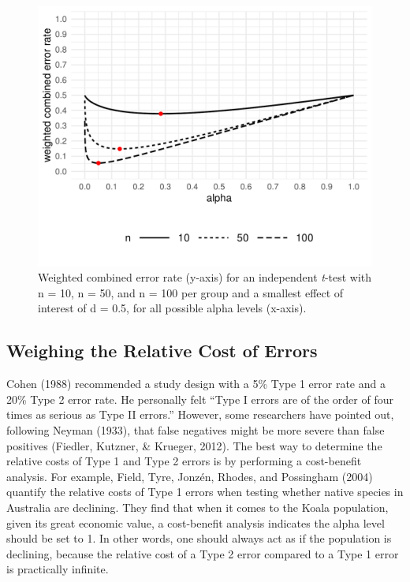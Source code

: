 \documentclass[
  english,
  ,man, a4paper,floatsintext]{apa6}
\begin{document}
\begin{figure}
\centering
\includegraphics{Justify_in_Practice_files/figure-latex/weight-plot-1.pdf}
\caption{\label{fig:weight-plot}Weighted combined error rate (y-axis) for an independent \emph{t}-test with n = 10, n = 50, and n = 100 per group and a smallest effect of interest of d = 0.5, for all possible alpha levels (x-axis).}
\end{figure}

\hypertarget{weighing-the-relative-cost-of-errors}{%
\subsection{Weighing the Relative Cost of Errors}\label{weighing-the-relative-cost-of-errors}}

Cohen (1988) recommended a study design with a 5\% Type 1 error rate and a 20\% Type 2 error rate. He personally felt ``Type I errors are of the order of four times as serious as Type II errors.'' However, some researchers have pointed out, following Neyman (1933), that false negatives might be more severe than false positives (Fiedler, Kutzner, \& Krueger, 2012). The best way to determine the relative costs of Type 1 and Type 2 errors is by performing a cost-benefit analysis. For example, Field, Tyre, Jonzén, Rhodes, and Possingham (2004) quantify the relative costs of Type 1 errors when testing whether native species in Australia are declining. They find that when it comes to the Koala population, given its great economic value, a cost-benefit analysis indicates the alpha level should be set to 1. In other words, one should always act as if the population is declining, because the relative cost of a Type 2 error compared to a Type 1 error is practically infinite.
\end{document}
